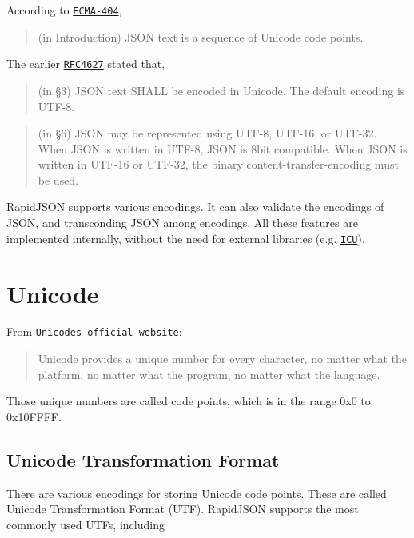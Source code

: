 According to \href{http://www.ecma-international.org/publications/files/ECMA-ST/ECMA-404.pdf}{\tt E\+C\+M\+A-\/404},

\begin{quote}
(in Introduction) J\+S\+ON text is a sequence of Unicode code points. \end{quote}


The earlier \href{http://www.ietf.org/rfc/rfc4627.txt}{\tt R\+F\+C4627} stated that,

\begin{quote}
(in §3) J\+S\+ON text S\+H\+A\+LL be encoded in Unicode. The default encoding is U\+T\+F-\/8. \end{quote}


\begin{quote}
(in §6) J\+S\+ON may be represented using U\+T\+F-\/8, U\+T\+F-\/16, or U\+T\+F-\/32. When J\+S\+ON is written in U\+T\+F-\/8, J\+S\+ON is 8bit compatible. When J\+S\+ON is written in U\+T\+F-\/16 or U\+T\+F-\/32, the binary content-\/transfer-\/encoding must be used. \end{quote}


Rapid\+J\+S\+ON supports various encodings. It can also validate the encodings of J\+S\+ON, and transconding J\+S\+ON among encodings. All these features are implemented internally, without the need for external libraries (e.\+g. \href{http://site.icu-project.org/}{\tt I\+CU}).\hypertarget{md_Cadriciel_Commun_Externe_RapidJSON_doc_encoding.zh-cn_Unicode}{}\section{Unicode}\label{md_Cadriciel_Commun_Externe_RapidJSON_doc_encoding.zh-cn_Unicode}
From \href{http://www.unicode.org/standard/WhatIsUnicode.html}{\tt Unicode\textquotesingle{}s official website}\+: \begin{quote}
Unicode provides a unique number for every character, no matter what the platform, no matter what the program, no matter what the language. \end{quote}


Those unique numbers are called code points, which is in the range {\ttfamily 0x0} to {\ttfamily 0x10\+F\+F\+FF}.\hypertarget{md_Cadriciel_Commun_Externe_RapidJSON_doc_encoding.zh-cn_UTF}{}\subsection{Unicode Transformation Format}\label{md_Cadriciel_Commun_Externe_RapidJSON_doc_encoding.zh-cn_UTF}
There are various encodings for storing Unicode code points. These are called Unicode Transformation Format (U\+TF). Rapid\+J\+S\+ON supports the most commonly used U\+T\+Fs, including


